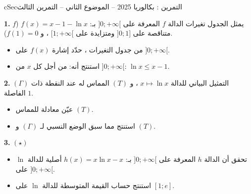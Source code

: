 \documentclass[12pt,a4paper]{article}
\newenvironment{BOX}[2]{\begin{otherlanguage}{english}\begin{arbox}{#1}{#2}}{\end{arbox}\end{otherlanguage}}
\newcounter{exo}
\newenvironment{tamrin}[1]{\stepcounter{exo}\begin{BOX}{cSec}{التمرين \theexo: #1}}{\end{BOX}}
\newenvironment{sq}{\begin{itemize}[leftmargin=2.4em,itemsep=3pt]}{\end{itemize}}
\newcommand{\qa}{\item[(أ)]}\newcommand{\qb}{\item[(ب)]}\newcommand{\qc}{\item[(جـ)]}\newcommand{\qd}{\item[(د)]}\newcommand{\qe}{\item[(هـ)]}
\newcommand{\QQ}[1]{\par\smallskip\textbf{#1.} }
\begin{document}
\begin{tamrin}{بكالوريا 2025 -- الموضوع الثاني -- التمرين الثالث}
\QQ{1} يمثل الجدول تغيرات الدالة $f$ المعرفة على $]0;+\infty[$ بـ: $f(x)=x-1-\ln x$ ($f$ متناقصة على $]0;1]$ ومتزايدة على $[1;+\infty[$ ، و $f(1)=0$).
\begin{sq}
\qa من جدول التغيرات ، حدّد إشارة $f(x)$ على $]0;+\infty[$.
\qb استنتج أنه: من أجل كل $x$ من $]0;+\infty[$: $\ln x\leqslant x-1$.
\end{sq}
\QQ{2} $(\Gamma)$ التمثيل البياني للدالة $x\mapsto\ln x$ ، و $(T)$ المماس له عند النقطة ذات الفاصلة $1$.
\begin{sq}
\qa عيّن معادلة للمماس $(T)$.
\qb استنتج مما سبق الوضع النسبي لـ $(\Gamma)$ و $(T)$.
\end{sq}
\QQ{3} $(\star)$
\begin{sq}
\qa تحقق أن الدالة $h$ المعرفة على $]0;+\infty[$ بـ: $h(x)=x\ln x-x$ أصلية للدالة $\ln$ على $]0;+\infty[$.
\qb استنتج حساب القيمة المتوسطة للدالة $\ln$ على $[1;e]$.
\end{sq}
\end{tamrin}
\end{document}
